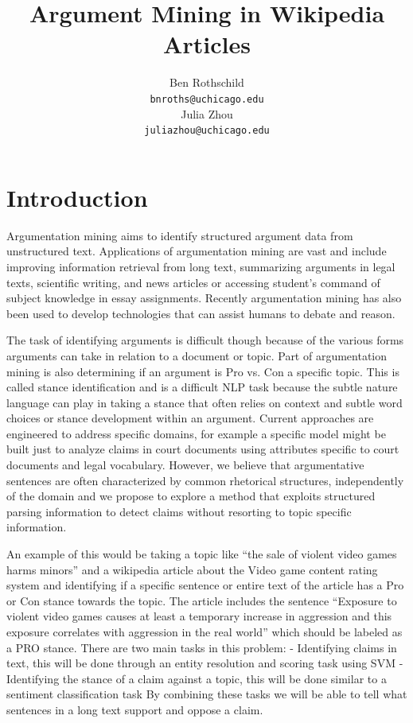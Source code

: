 \documentclass[11pt,a4paper]{article}
\title{Argument Mining in Wikipedia Articles}
\author{Ben Rothschild \\
  {\tt bnroths@uchicago.edu} \\\And
  Julia Zhou \\
  {\tt juliazhou@uchicago.edu} \\}
\date{}
\begin{document}
\maketitle
\begin{abstract}
  
\end{abstract}

\section{Introduction}
Argumentation mining aims to identify structured argument data from unstructured text.  Applications of argumentation mining are vast and include improving information retrieval from long text, summarizing arguments in legal texts, scientific writing, and news articles or accessing student's command of subject knowledge in essay assignments.  Recently argumentation mining has also been used to develop technologies that can assist humans to debate and reason.  

The task of identifying arguments is difficult though because of the various forms arguments can take in relation to a document or topic.  Part of argumentation mining is also determining if an argument is Pro vs. Con a specific topic.  This is called stance identification and is a difficult NLP task because the subtle nature language can play in taking a stance that often relies on context and subtle word choices or stance development within an argument.  Current approaches are engineered to address specific domains, for example a specific model might be built just to analyze claims in court documents using attributes specific to court documents and legal vocabulary.  However, we believe that argumentative sentences are often characterized by common rhetorical structures, independently of the domain and we propose to explore a method that exploits structured parsing information to detect claims without resorting to topic specific information. 

An example of this would be taking a topic like “the sale of violent video games harms minors” and a wikipedia article about the ​Video game content rating system​ and identifying if a specific sentence or entire text of the article has a Pro or Con stance towards the topic. The article includes the sentence “Exposure to violent video games causes at least a temporary increase in aggression and this exposure correlates with aggression in the real world” which should be labeled as a PRO stance.
There are two main tasks in this problem:
- Identifying claims in text, this will be done through an entity resolution and scoring task
using SVM
- Identifying the stance of a claim against a topic, this will be done similar to a sentiment
classification task
By combining these tasks we will be able to tell what sentences in a long text support and oppose a claim.
\end{document}
